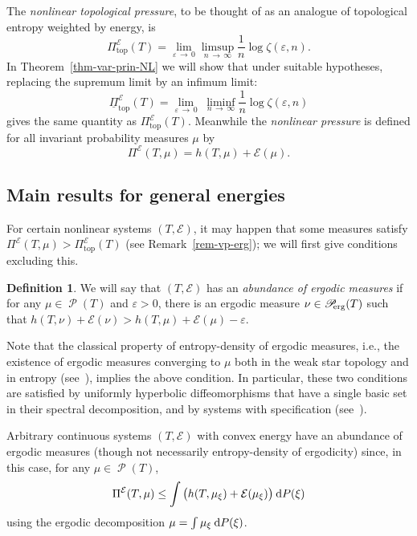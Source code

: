 \documentclass[10pt]{amsart}
\theoremstyle{definition}\newtheorem{defi}[theo]{Definition}\newtheorem{rema}[theo]{Remark}\newtheorem{exam}[theo]{Example}\newtheorem{exem}[theo]{Example}\newtheorem{nota}[theo]{Notation}
\theoremstyle{plain}
\theoremstyle{plain}
\newcommand\eps{\varepsilon}
\newcommand\NLP{\Pi}
\newcommand\Proberg{\Prob_{\kern-3pt\mathrm{erg}}}
\renewcommand\top{{\mathrm{top}}}
\newcommand\Prob{{\operatorname{\mathscr{P}}}}
\newcommand*{\dd} {\relax\ifnum\lastnodetype>0\mskip\medmuskip\fi\mathrm{d}}
\newcounter{In}
\newcommand*\8{\infty}
\newcommand{\En}{\mathcal{E}}
\begin{document}
The \emph{nonlinear topological pressure}, to be thought of as an analogue of topological entropy weighted by energy, is
\begin{equation}\label{eq:NLP}
\NLP_\top^\En(T) = \lim_{\eps\,\to\,0} \limsup_{n\,\to\,\infty} \frac1n \log \zeta(\eps,n).
\end{equation}
In Theorem~\ref{thm-var-prin-NL} we will show that under suitable hypotheses, replacing the supremum limit by an infimum limit:
\[
\underline{\NLP}_\top^\En(T) = \lim_{\eps\,\to\,0}\; \liminf_{n\,\to\,\infty} \frac1n \log \zeta(\eps,n)
\]
gives the same quantity as $\NLP_\top^\En(T) $. Meanwhile the \emph{nonlinear pressure} is defined for all invariant probability measures $\mu$ by
\[
\NLP^\En(T,\mu) = h(T,\mu) + \En(\mu).
\]


\subsection{Main results for general energies}

For certain nonlinear systems $(T,\En)$, it may happen that some measures satisfy $\NLP^\En(T,\mu) > \NLP_\top^\En(T)$ (see Remark~\ref{rem-vp-erg}); we will first give conditions excluding this.

\begin{defi}
We will say that $(T,\En)$ has an \emph{abundance of ergodic measures} if for any $\mu\in\Prob(T)$ and $\eps>0$, there is an ergodic measure $\nu\in \Proberg(T)$ such that { $h(T,\nu)+\En(\nu)> h(T,\mu)+\En(\mu)-\eps$}.
\end{defi}


Note that the classical property of entropy-density of ergodic measures, i.e., the existence of ergodic measures converging to $\mu$ both in the weak star topology and in entropy (see~\cite[Lemma~3.2]{FollmerOrey1988}), implies the above condition. In particular, these two conditions are satisfied by uniformly hyperbolic diffeomorphisms that have a single basic set in their spectral decomposition, and by systems with specification (see~\cite{PfisterSullivan2007}).


Arbitrary continuous systems $(T,\En)$ with convex energy have an abundance of ergodic measures (though not necessarily entropy-density of ergodicity) since, in this case, for any $\mu\in\Prob(T)$,
\[
\NLP^\En(T,\mu) \le \int \big(h(T,\mu_\xi) + \En(\mu_\xi) \big) \dd P(\xi)
\]
using the ergodic decomposition $\mu=\int \mu_\xi \dd P(\xi)$.



\end{document}
